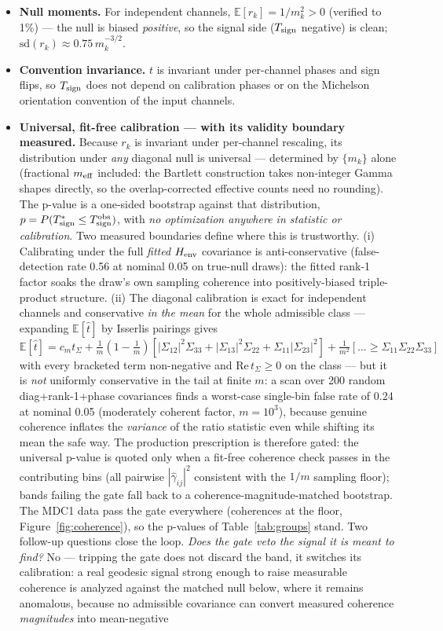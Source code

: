 \documentclass[11pt]{article}
\begin{document}
\begin{itemize}
\item \textbf{Null moments.} For independent channels, $\mathbb{E}[r_k] = 1/m_k^2 > 0$ (verified to 1\%) --- the null is biased \emph{positive}, so the signal side ($T_{\rm sign}$ negative) is clean; $\mathrm{sd}(r_k) \approx 0.75\,m_k^{-3/2}$.
\item \textbf{Convention invariance.} $t$ is invariant under per-channel phases and sign flips, so $T_{\rm sign}$ does not depend on calibration phases or on the Michelson orientation convention of the input channels.
\item \textbf{Universal, fit-free calibration --- with its validity boundary measured.} Because $r_k$ is invariant under per-channel rescaling, its distribution under \emph{any} diagonal null is universal --- determined by $\{m_k\}$ alone (fractional $m_{\rm eff}$ included: the Bartlett construction takes non-integer Gamma shapes directly, so the overlap-corrected effective counts need no rounding). The p-value is a one-sided bootstrap against that distribution, $p = P(T^*_{\rm sign} \le T^{\rm obs}_{\rm sign})$, with \emph{no optimization anywhere in statistic or calibration}. Two measured boundaries define where this is trustworthy. (i) Calibrating under the full \emph{fitted} $H_{\rm env}$ covariance is anti-conservative (false-detection rate 0.56 at nominal 0.05 on true-null draws): the fitted rank-1 factor soaks the draw's own sampling coherence into positively-biased triple-product structure. (ii) The diagonal calibration is exact for independent channels and conservative \emph{in the mean} for the whole admissible class --- expanding $\mathbb{E}[\hat t]$ by Isserlis pairings gives $\mathbb{E}[\hat t] = c_m t_\Sigma + \tfrac{1}{m}(1{-}\tfrac1m)\left[|\Sigma_{12}|^2\Sigma_{33} + |\Sigma_{13}|^2\Sigma_{22} + \Sigma_{11}|\Sigma_{23}|^2\right] + \tfrac{1}{m^2}\left[\dots \ge \Sigma_{11}\Sigma_{22}\Sigma_{33}\right]$ with every bracketed term non-negative and $\mathrm{Re}\,t_\Sigma \ge 0$ on the class --- but it is \emph{not} uniformly conservative in the tail at finite $m$: a scan over 200 random diag+rank-1+phase covariances finds a worst-case single-bin false rate of 0.24 at nominal 0.05 (moderately coherent factor, $m = 10^3$), because genuine coherence inflates the \emph{variance} of the ratio statistic even while shifting its mean the safe way. The production prescription is therefore gated: the universal p-value is quoted only when a fit-free coherence check passes in the contributing bins (all pairwise $|\hat\gamma_{ij}|^2$ consistent with the $1/m$ sampling floor); bands failing the gate fall back to a coherence-magnitude-matched bootstrap. The MDC1 data pass the gate everywhere (coherences at the floor, Figure~\ref{fig:coherence}), so the p-values of Table~\ref{tab:groups} stand. Two follow-up questions close the loop. \emph{Does the gate veto the signal it is meant to find?} No --- tripping the gate does not discard the band, it switches its calibration: a real geodesic signal strong enough to raise measurable coherence is analyzed against the matched null below, where it remains anomalous, because no admissible covariance can convert measured coherence \emph{magnitudes} into mean-negative 
\end{itemize}
\end{document}
